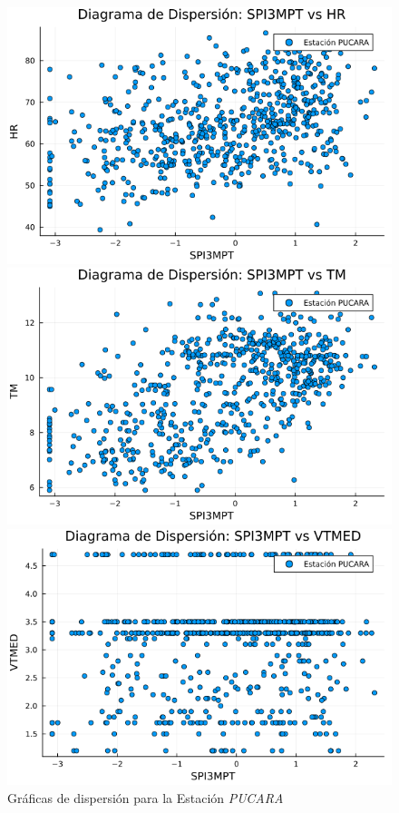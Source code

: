 \begin{figure}[htbp]
\centering
\caption{Gráficas de dispersión para la Estación \textit{PUCARA}}
\begin{minipage}{0.32\textwidth}
    \centering
    \includegraphics[width=\linewidth]{Capitulos/Scaterplot/PUCARA_SPI3MPT_vs_HR.png}
\end{minipage}\hfill
\begin{minipage}{0.32\textwidth}
    \centering
    \includegraphics[width=\linewidth]{Capitulos/Scaterplot/PUCARA_SPI3MPT_vs_TM.png}
\end{minipage}\hfill
\begin{minipage}{0.32\textwidth}
    \centering
    \includegraphics[width=\linewidth]{Capitulos/Scaterplot/PUCARA_SPI3MPT_vs_VTMED.png}

\end{minipage}
\end{figure}
